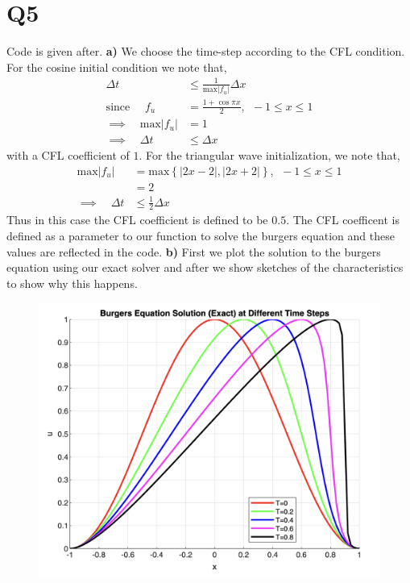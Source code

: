 \pagebreak

\section*{Q5}
\begin{solution}
\hfill\break
Code is given after.
\hfill\break
\hfill\break
\textbf{a)} \quad We choose the time-step according to the CFL condition. For the cosine initial condition we note that,
\begin{align*}
    \Delta t &\leq \frac{1}{\text{max} \left| f_u\right|} \Delta x \\
    \text{since }\quad f_u &= \frac{1 + \cos \pi x}{2}, \ \ -1 \leq x \leq 1 \\
    \implies \quad \text{max} \left| f_u\right| &= 1 \\
    \implies \quad  \Delta t &\leq \Delta x
\end{align*}
with a CFL coefficient of $1$.
\hfill\break
\hfill\break
For the triangular wave initialization, we note that,
\begin{align*}
    \text{max} \left| f_u \right| &= \text{max} \left\{ \left|2x - 2\right|, \left|2x + 2\right| \right\}, \ \ -1 \leq x \leq 1 \\
                                  &= 2 \\
    \implies \quad \Delta t &\leq \frac{1}{2} \Delta x
\end{align*}
Thus in this case the CFL coefficient is defined to be $0.5$.
\hfill\break
\hfill\break
The CFL coefficent is defined as a parameter to our function to solve the burgers equation and these values are reflected in the code.
\hfill\break
\hfill\break
\textbf{b)} First we plot the solution to the burgers equation using our exact solver and after we show sketches of the characteristics to show why this happens.
\begin{figure}[H]
    \centering
    \includegraphics[scale=0.35]{./figures/q5-cos.png}

\end{figure}
\end{solution}
